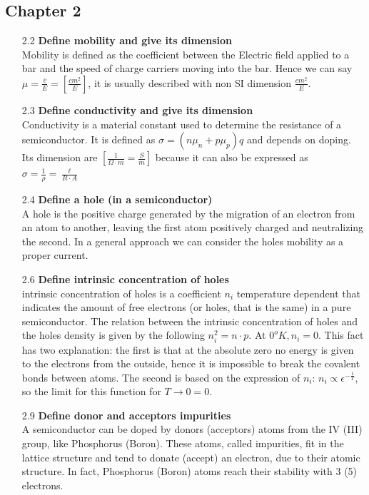 \documentclass[12pt]{article}
\newcommand{\B}{\textbf}
\begin{document}
\subsection*{Chapter 2}
\begin{itemize}
	\item[2.2] \B{Define mobility and give its dimension}\\ 
	Mobility is defined as the coefficient between the Electric field applied to a bar and the speed of charge carriers moving into the bar. Hence we can say $\mu = \frac{\bar v}{E} = [\frac{cm^2}{E}]$, it is usually described with non SI dimension $\frac{cm^2}{E}$.
	\item[2.3] \B{Define conductivity and give its dimension}\\ 
	 Conductivity is a material constant used to determine the resistance of a semiconductor. It is defined as $\sigma = (n\mu_n + p\mu_p)q$ and depends on doping. Its dimension are $[\frac{1}{\Omega \cdot m} = \frac{S}{m}]$ because it can also be expressed as $\sigma = \frac{1}{\rho} = \frac{\ell}{R\cdot A}$
	\item[2.4] \B{Define a hole (in a semiconductor)}\\ 
	A hole is the positive charge generated by the migration of an electron from an atom to another, leaving the first atom positively charged and neutralizing the second. In a general approach we can consider the holes mobility as a proper current. 
	\item[2.6] \B{Define intrinsic concentration of holes}\\
	 intrinsic concentration of holes is a coefficient $n_i$ temperature dependent that indicates the amount of free electrons (or holes, that is the same) in a pure semiconductor. The relation between the intrinsic concentration of holes and the holes density is given by the following $n_i^2 = n \cdot p$. At $0^o K, n_i = 0$. This fact has two explanation: the first is that at the absolute zero no energy is given to the electrons from the outside, hence it is impossible to break the covalent bonds between atoms. The second is based on the expression of $n_i$: $n_i \propto \epsilon^{-\frac{1}{T}}$, so the limit for this function for $T\rightarrow0 = 0$. 
	\item[2.9] \B{Define donor and acceptors impurities}\\ 
	A semiconductor can be doped by donors (acceptors) atoms from the IV (III) group, like Phosphorus (Boron). These atoms, called impurities, fit in the lattice structure and tend to donate (accept) an electron, due to their atomic structure. In fact, Phosphorus (Boron) atoms reach their stability with 3 (5) electrons. 

\end{itemize}
\end{document}
